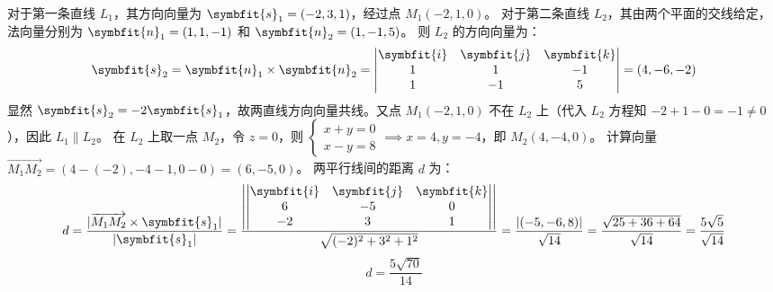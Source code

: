 \begin{solution}

    对于第一条直线 $L_1$，其方向向量为 $\symbfit{s}_1 = (-2, 3, 1)$，经过点 $M_1(-2, 1, 0)$。
    对于第二条直线 $L_2$，其由两个平面的交线给定，法向量分别为 $\symbfit{n}_1 = (1, 1, -1)$ 和 $\symbfit{n}_2 = (1, -1, 5)$。
    则 $L_2$ 的方向向量为：
    \begin{equation}
        \symbfit{s}_2 = \symbfit{n}_1 \times \symbfit{n}_2 = \begin{vmatrix} \symbfit{i} & \symbfit{j} & \symbfit{k} \\ 1 & 1 & -1 \\ 1 & -1 & 5 \end{vmatrix} = (4, -6, -2)
    \end{equation}
    显然 $\symbfit{s}_2 = -2 \symbfit{s}_1$，故两直线方向向量共线。又点 $M_1(-2, 1, 0)$ 不在 $L_2$ 上（代入 $L_2$ 方程知 $-2+1-0 = -1 \neq 0$），因此 $L_1 \parallel L_2$。
    在 $L_2$ 上取一点 $M_2$，令 $z=0$，则 $\begin{cases} x+y=0 \\ x-y=8 \end{cases} \implies x=4, y=-4$，即 $M_2(4, -4, 0)$。
    计算向量 $\overrightarrow{M_1 M_2} = (4 - (-2), -4 - 1, 0 - 0) = (6, -5, 0)$。
    两平行线间的距离 $d$ 为：
    \begin{equation}
        d = \frac{|\overrightarrow{M_1 M_2} \times \symbfit{s}_1|}{|\symbfit{s}_1|} = \frac{\left| \begin{vmatrix} \symbfit{i} & \symbfit{j} & \symbfit{k} \\ 6 & -5 & 0 \\ -2 & 3 & 1 \end{vmatrix} \right|}{\sqrt{(-2)^2 + 3^2 + 1^2}} = \frac{|(-5, -6, 8)|}{\sqrt{14}} = \frac{\sqrt{25 + 36 + 64}}{\sqrt{14}} = \frac{5\sqrt{5}}{\sqrt{14}}
    \end{equation}
    \begin{equation}
        \boxed{d = \frac{5\sqrt{70}}{14}}
    \end{equation}



\end{solution}
